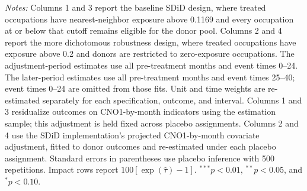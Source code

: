 \begin{table}[H]
\begin{threeparttable}
\begin{tablenotes}[flushleft]
\item \emph{Notes:} Columns 1 and 3 report the baseline SDiD design, where treated occupations have nearest-neighbor exposure above 0.1169 and every occupation at or below that cutoff remains eligible for the donor pool. Columns 2 and 4 report the more dichotomous robustness design, where treated occupations have exposure above 0.2 and donors are restricted to zero-exposure occupations. The adjustment-period estimates use all pre-treatment months and event times 0--24. The later-period estimates use all pre-treatment months and event times 25--40; event times 0--24 are omitted from those fits. Unit and time weights are re-estimated separately for each specification, outcome, and interval. Columns 1 and 3 residualize outcomes on CNO1-by-month indicators using the estimation sample; this adjustment is held fixed across placebo assignments. Columns 2 and 4 use the SDiD implementation's projected CNO1-by-month covariate adjustment, fitted to donor outcomes and re-estimated under each placebo assignment. Standard errors in parentheses use placebo inference with 500 repetitions. Impact rows report $100[\exp(\widehat{\tau})-1]$. $^{***}p<0.01$, $^{**}p<0.05$, and $^{*}p<0.10$.
\end{tablenotes}
\end{threeparttable}
\end{table}
